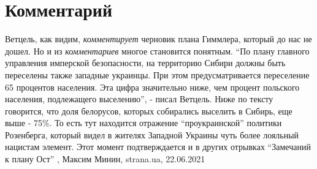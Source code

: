  
 
 
 
 
\chapter{Комментарий}

Ветцель, как видим, \emph{комментирует} черновик плана Гиммлера, который до нас
не дошел. Но и из \emph{комментариев} многое становится понятным. 
\enquote{По плану главного управления имперской безопасности, на территорию
Сибири должны быть переселены также западные украинцы. При этом
предусматривается переселение 65 процентов населения. Эта цифра значительно
ниже, чем процент польского населения, подлежащего выселению}, - писал Ветцель.
Ниже по тексту говорится, что доля белорусов, которых собирались выселить в
Сибирь, еще выше - 75\%. То есть тут находится отражение
\enquote{проукраинской} политики Розенберга, который видел в жителях Западной
Украины чуть более лояльный нацистам элемент.  Этот момент подтверждается и в
других отрывках \enquote{Замечаний к плану Ост}
  , Максим Минин, strana.ua, 22.06.2021

